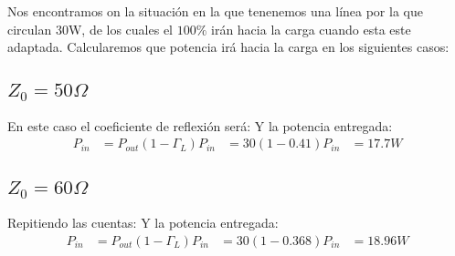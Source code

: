 
Nos encontramos on la situación en la que tenenemos una línea por la que circulan 30W, de los cuales el $100\%$ irán hacia la carga cuando esta este adaptada. Calcularemos que potencia irá hacia la carga en los siguientes casos:
\subsection{$Z_0 = 50\Omega$}
En este caso el coeficiente de reflexión será:
Y la potencia entregada:
\begin{align*}
  P_{in} &= P_{out}(1- \Gamma_L)
  P_{in} &= 30(1- 0.41)
  P_{in} &= 17.7 W
\end{align*}
\subsection{$Z_0 = 60\Omega$}
Repitiendo las cuentas:
Y la potencia entregada:
\begin{align*}
  P_{in} &= P_{out}(1- \Gamma_L)
  P_{in} &= 30(1- 0.368)
  P_{in} &= 18.96 W
\end{align*}
